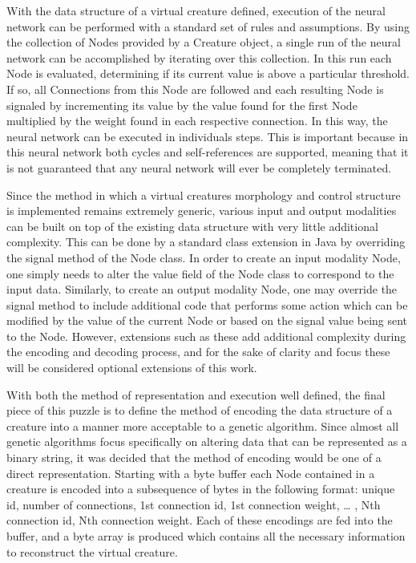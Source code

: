 \documentclass[12pt]{article}
\begin{document}
With the data structure of a virtual creature defined, execution of the neural network can be performed with a standard set of rules and assumptions.
By using the collection of Nodes provided by a Creature object, a single run of the neural network can be accomplished by iterating over this collection.
In this run each Node is evaluated, determining if its current value is above a particular threshold.
If so, all Connections from this Node are followed and each resulting Node is signaled by incrementing its value by the value found for the first Node multiplied by the weight found in each respective connection.
In this way, the neural network can be executed in individuals steps.
This is important because in this neural network both cycles and self-references are supported, meaning that it is not guaranteed that any neural network will ever be completely terminated.

Since the method in which a virtual creatures morphology and control structure is implemented remains extremely generic, various input and output modalities can be built on top of the existing data structure with very little additional complexity.
This can be done by a standard class extension in Java by overriding the signal method of the Node class.
In order to create an input modality Node, one simply needs to alter the value field of the Node class to correspond to the input data.
Similarly, to create an output modality Node, one may override the signal method to include additional code that performs some action which can be modified by the value of the current Node or based on the signal value being sent to the Node.
However, extensions such as these add additional complexity during the encoding and decoding process, and for the sake of clarity and focus these will be considered optional extensions of this work.

With both the method of representation and execution well defined, the final piece of this puzzle is to define the method of encoding the data structure of a creature into a manner more acceptable to a genetic algorithm.
Since almost all genetic algorithms focus specifically on altering data that can be represented as a binary string, it was decided that the method of encoding would be one of a direct representation.
Starting with a byte buffer each Node contained in a creature is encoded into a subsequence of bytes in the following format:  unique id, number of connections, 1st connection id, 1st connection weight, … , Nth connection id, Nth connection weight.
Each of these encodings are fed into the buffer, and a byte array is produced which contains all the necessary information to reconstruct the virtual creature.
\end{document}
